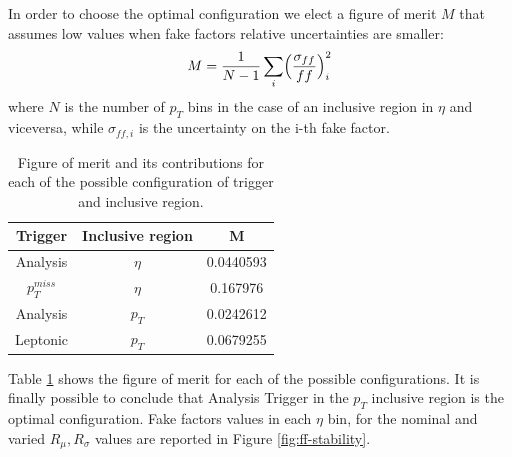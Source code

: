 In order to choose the optimal configuration we elect a figure of merit $M$ that assumes low values when fake factors relative uncertainties are smaller: 
\begin{equation}
    M = \frac{1}{N-1} \sum_i \Bigl(\frac{\sigma_{ff}}{ff}\Bigr)_i^2 
    \end{equation}
where $N$ is the number of $p_T$ bins in the case of an inclusive region in $\eta$ and viceversa, while $\sigma_{ff,i}$ is the uncertainty on the i-th fake factor. 

\begin{table}[H]
\centering
\begin{tabular}{|c|c|c|}
\hline
Trigger & Inclusive region  & M \\
\hline
Analysis & $\eta$ &0.0440593\\
\hline
$p_T^{miss}$ & $\eta$  & 0.167976 \\
\hline
Analysis & $p_T$  & 0.0242612\\
\hline
Leptonic & $p_T$ & 0.0679255\\
\hline
\end{tabular}
\caption{Figure of merit and its contributions for each of the possible configuration of trigger and inclusive region.}
\label{tab: fom}
\end{table}

Table \ref{tab: fom} shows the figure of merit for each of the possible configurations. It is finally possible to conclude that Analysis Trigger in the $p_T$ inclusive region is the optimal configuration. Fake factors values in each $\eta$ bin, for the nominal and varied $R_\mu, R_\sigma$ values are reported in Figure \ref{fig:ff-stability}. 



